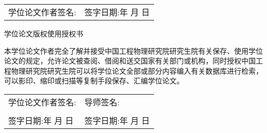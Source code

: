 \vspace{30pt}

\noindent \begin{tabular}{@{}p{}p{}}
  学位论文作者签名: & 签字日期:\qquad \quad 年 \quad 月 \quad 日
\end{tabular}

\vspace{80pt}
\begin{center}
  学位论文版权使用授权书
\end{center}

\vspace{30pt}
\par 本学位论文作者完全了解并接受中国工程物理研究院研究生院有关保存、使用学位论文的规定，允许论文被查阅、借阅和送交国家有关部门或机构，同时授权中国工程物理研究院研究生院可以将学位论文全部或部分内容编入有关数据库进行检索，可以影印、缩印或扫描等复制手段保存、汇编学位论文。

\vspace{40pt}
\begin{flushleft}
\begin{tabular}{@{}p{}p{}}
学位论文作者签名:                          & 导师签名:                                  \\
  \\
签字日期:\qquad \quad 年 \quad 月 \quad 日 & 签字日期:\qquad \quad 年 \quad 月 \quad 日
\end{tabular}
\end{flushleft}


\clearpage

\pagestyle{fancy}